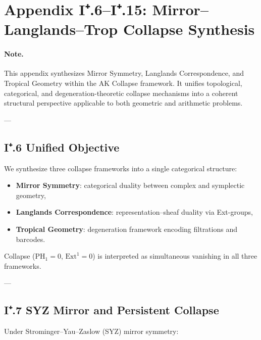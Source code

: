 \documentclass[11pt]{article}
\begin{document}

\section*{Appendix I⁺.6–I⁺.15: Mirror–Langlands–Trop Collapse Synthesis}

\paragraph{Note.}  
This appendix synthesizes Mirror Symmetry, Langlands Correspondence, and Tropical Geometry  
within the AK Collapse framework. It unifies topological, categorical, and degeneration-theoretic  
collapse mechanisms into a coherent structural perspective applicable to both geometric and arithmetic problems.

---

\subsection*{I⁺.6 Unified Objective}

We synthesize three collapse frameworks into a single categorical structure:

\begin{itemize}
  \item \textbf{Mirror Symmetry}: categorical duality between complex and symplectic geometry,
  \item \textbf{Langlands Correspondence}: representation–sheaf duality via Ext-groups,
  \item \textbf{Tropical Geometry}: degeneration framework encoding filtrations and barcodes.
\end{itemize}

Collapse ($\mathrm{PH}_1 = 0$, $\mathrm{Ext}^1 = 0$) is interpreted as simultaneous vanishing in all three frameworks.

---

\subsection*{I⁺.7 SYZ Mirror and Persistent Collapse}

Under Strominger–Yau–Zaslow (SYZ) mirror symmetry:
\end{document}
